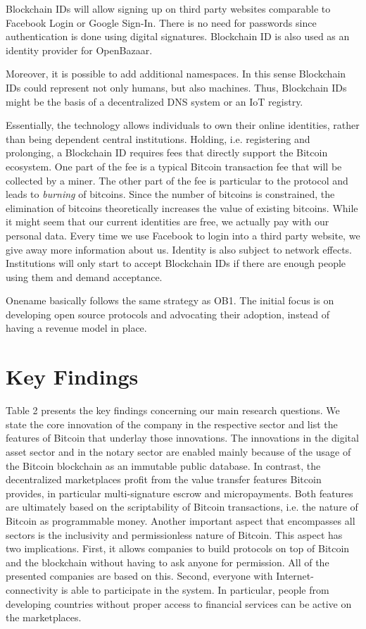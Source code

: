 Blockchain IDs will allow signing up on third party websites comparable to Facebook 
Login or Google Sign-In. There is no need for passwords since authentication is 
done using digital signatures. Blockchain ID is also used as an identity provider 
for OpenBazaar. 

Moreover, it is possible to add additional namespaces. In this sense Blockchain 
IDs could represent not only humans, but also machines. Thus, Blockchain IDs might 
be the basis of a decentralized DNS system or an IoT registry. 

Essentially, the technology allows individuals to own their online identities, 
rather than being dependent central institutions. Holding, i.e. registering and 
prolonging, a Blockchain ID requires fees that directly support the Bitcoin ecosystem. 
One part of the fee is a typical Bitcoin transaction fee that will be collected 
by a miner. The other part of the fee is particular to the protocol and leads to 
\emph{burning} of bitcoins. Since the number of bitcoins is constrained, the elimination 
of bitcoins theoretically increases the value of existing bitcoins. While it might 
seem that our current identities are free, we actually pay with our personal data. 
Every time we use Facebook to login into a third party website, we give away more 
information about us. Identity is also subject to network effects. Institutions 
will only start to accept Blockchain IDs if there are enough people using them 
and demand acceptance. 

Onename basically follows the same strategy as OB1. The initial focus is on developing 
open source protocols and advocating their adoption, instead of having a revenue 
model in place.

\section{Key Findings}
\label{sec:eco:findings}

Table 2 presents the key findings concerning our main research questions. We state 
the core innovation of the company in the respective sector and list the features 
of Bitcoin that underlay those innovations. The innovations in the digital asset 
sector and in the notary sector are enabled mainly because of the usage of the 
Bitcoin blockchain as an immutable public database. In contrast, the decentralized 
marketplaces profit from the value transfer features Bitcoin provides, in particular 
multi-signature escrow and micropayments. Both features are ultimately based on 
the scriptability of Bitcoin transactions, i.e. the nature of Bitcoin as programmable 
money. Another important aspect that encompasses all sectors is the inclusivity 
and permissionless nature of Bitcoin. This aspect has two implications. First, 
it allows companies to build protocols on top of Bitcoin and the blockchain without 
having to ask anyone for permission. All of the presented companies are based on 
this. Second, everyone with Internet-connectivity is able to participate in the 
system. In particular, people from developing countries without proper access to 
financial services can be active on the marketplaces. 

